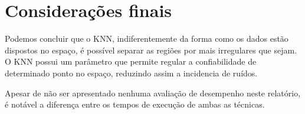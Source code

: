 \documentclass[ 
	article,			%
	11pt,				%
	oneside,			%
	a4paper,			%
	english,			%
	brazil,				%
	]{abntex2}
\begin{document}
% 

\section*{Considerações finais}
Podemos concluir que o KNN,  indiferentemente da forma como os dados estão
dispostos no espaço, é possível separar as regiões por mais irregulares que
sejam. O KNN possui um parâmetro que permite regular a confiabilidade de
determinado ponto no espaço, reduzindo assim a incidencia de ruídos.

Apesar de não ser apresentado nenhuma avaliação de desempenho neste relatório, é
notável a diferença entre os tempos de execução de ambas as técnicas.
 






\postextual



%
% 

\end{document}
